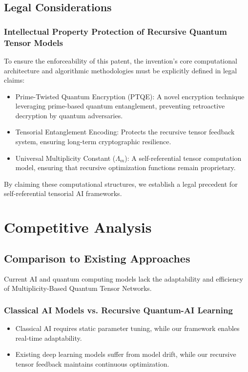 \documentclass{article}
\theoremstyle{plain}
\begin{document}
\subsection{Legal Considerations}
\subsubsection{Intellectual Property Protection of Recursive Quantum Tensor Models}
To ensure the enforceability of this patent, the invention’s core computational architecture and algorithmic methodologies must be explicitly defined in legal claims:
\begin{itemize}
    \item Prime-Twisted Quantum Encryption (PTQE): A novel encryption technique leveraging prime-based quantum entanglement, preventing retroactive decryption by quantum adversaries.
    \item Tensorial Entanglement Encoding: Protects the recursive tensor feedback system, ensuring long-term cryptographic resilience.
    \item Universal Multiplicity Constant ($\Lambda_m$): A self-referential tensor computation model, ensuring that recursive optimization functions remain proprietary.
\end{itemize}
By claiming these computational structures, we establish a legal precedent for self-referential tensorial AI frameworks.

\section{Competitive Analysis}

\subsection{Comparison to Existing Approaches}
Current AI and quantum computing models lack the adaptability and efficiency of Multiplicity-Based Quantum Tensor Networks.

\subsubsection{Classical AI Models vs. Recursive Quantum-AI Learning}
\begin{itemize}
    \item Classical AI requires static parameter tuning, while our framework enables real-time adaptability.
    \item Existing deep learning models suffer from model drift, while our recursive tensor feedback maintains continuous optimization.
\end{itemize}
\end{document}
